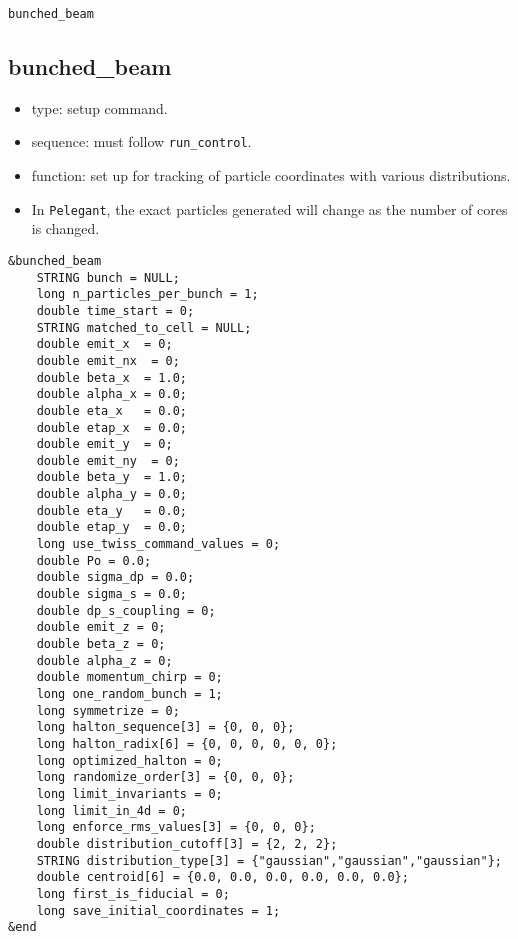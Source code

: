 \documentclass[11pt]{article}
\begin{document}
\newpage
\begin{center}{\Large\verb|bunched_beam|}\end{center}
\subsection{bunched\_beam \label{subsec:bunchedbeam}}

\begin{itemize}
\item type: setup command.
\item sequence: must follow \verb|run_control|.
\item function: set up for tracking of particle coordinates with various distributions.
\item In \verb|Pelegant|, the exact particles generated will change as the number of cores is changed.
\end{itemize}

\begin{verbatim}
&bunched_beam
    STRING bunch = NULL;
    long n_particles_per_bunch = 1;
    double time_start = 0;
    STRING matched_to_cell = NULL;
    double emit_x  = 0;
    double emit_nx  = 0;
    double beta_x  = 1.0;
    double alpha_x = 0.0;
    double eta_x   = 0.0;
    double etap_x  = 0.0;
    double emit_y  = 0;
    double emit_ny  = 0;
    double beta_y  = 1.0;
    double alpha_y = 0.0;
    double eta_y   = 0.0;
    double etap_y  = 0.0;
    long use_twiss_command_values = 0;
    double Po = 0.0;
    double sigma_dp = 0.0;
    double sigma_s = 0.0;
    double dp_s_coupling = 0;
    double emit_z = 0;
    double beta_z = 0;
    double alpha_z = 0;
    double momentum_chirp = 0;
    long one_random_bunch = 1;
    long symmetrize = 0;
    long halton_sequence[3] = {0, 0, 0};
    long halton_radix[6] = {0, 0, 0, 0, 0, 0};
    long optimized_halton = 0;
    long randomize_order[3] = {0, 0, 0};
    long limit_invariants = 0;
    long limit_in_4d = 0;
    long enforce_rms_values[3] = {0, 0, 0};
    double distribution_cutoff[3] = {2, 2, 2};
    STRING distribution_type[3] = {"gaussian","gaussian","gaussian"};
    double centroid[6] = {0.0, 0.0, 0.0, 0.0, 0.0, 0.0};
    long first_is_fiducial = 0;
    long save_initial_coordinates = 1;
&end
\end{verbatim}
\end{document}
